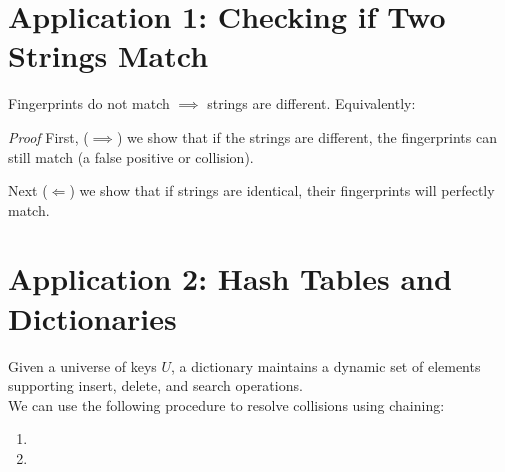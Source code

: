 \documentclass[11pt]{exam}
\begin{document}
	
	
	
	\newpage
	
	
	\newpage

	\section{Application 1: Checking if Two Strings Match}
	
	\begin{theorem}
		Fingerprints do not match $\implies$ strings are different. Equivalently:
		\begin{center}
		\end{center}
	\end{theorem}
	
	\textit{Proof} First, ($\implies$) we show that if the strings are different, the fingerprints can still match (a false positive or collision).\\
	\vspace{4cm}
	
	
	Next ($\Leftarrow$) we show that if strings are identical, their fingerprints will perfectly match.\\
	
	\newpage
	
	\section{Application 2: Hash Tables and Dictionaries}
	Given a universe of keys $U$, a dictionary maintains a dynamic set of elements supporting insert, delete, and search operations. \\
	
	We can use the following procedure to resolve collisions using chaining:
	\begin{enumerate}
		\item  %
		\item  %
		\vs{1cm}
	\end{enumerate}
	
	
	
\end{document}
